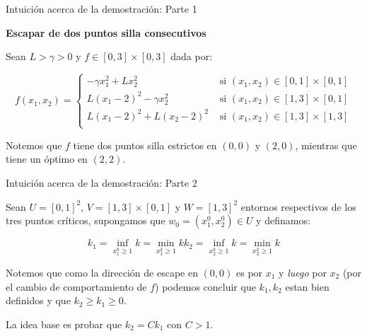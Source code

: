 \documentclass{beamer}
\begin{document}
\begin{frame}{Intuici\'on acerca de la demostraci\'on: Parte 1}

\textbf{Escapar de dos puntos silla consecutivos}

\bigskip
\pause

	Sean $L > \gamma > 0$ y $f \in [0,3] \times [0,3]$ dada por:
	
	\begin{equation*}
	f(x_1, x_2) = \left\lbrace \begin{array}{cc}
	- \gamma x_1^2 + Lx_2^2 & \text{ si } (x_1,x_2) \in [0,1] \times [0,1] \\
	L \left(x_1 - 2\right)^2 - \gamma x_2^2 & \text{ si } (x_1,x_2) \in [1,3] \times [0,1] \\
	L \left(x_1 - 2\right)^2 + L \left(x_2 - 2\right)^2 & \text{ si } (x_1,x_2) \in [1,3] \times [1,3] \\
	\end{array} \right.
	\end{equation*}
	
	\pause
	\bigskip
	
	Notemos que $f$ tiene dos puntos silla estrictos en $(0,0)$ y $(2,0)$, mientras que tiene un \'optimo en $(2,2)$. 
	
\end{frame}
\begin{frame}{Intuici\'on acerca de la demostraci\'on: Parte 2}
	
	Sean $U = [0,1]^2$, $V= [1,3] \times [0,1]$ y $W = [1,3]^2$ entornos respectivos de los tres puntos cr\'iticos, supongamos que $w_0 = \left(x^0_1, x^0_2\right) \in U$ y definamos:
	
	\begin{subequations}
		\begin{equation*}
		k_1 = \inf\limits_{x^k_1 \geq 1}{k} = \min\limits_{x^k_1 \geq 1}{k}
		\end{equation*}
		\begin{equation*}
		k_2 = \inf\limits_{x^k_2 \geq 1}{k} = \min\limits_{x^k_2 \geq 1}{k}
		\end{equation*}
	\end{subequations}
	
	\pause
	\bigskip
	
	Notemos que como la direcci\'on de escape en $(0,0)$ es por $x_1$ y \textit{luego} por $x_2$ (por el cambio de comportamiento de $f$) podemos concluir que $k_1,k_2$ estan bien definidos y que $k_2 \geq k_1 \geq 0$.
	
	\medskip
	La idea base es probar que $k_2 = Ck_1$ con $C>1$.
	
\end{frame}
	
\end{document}
